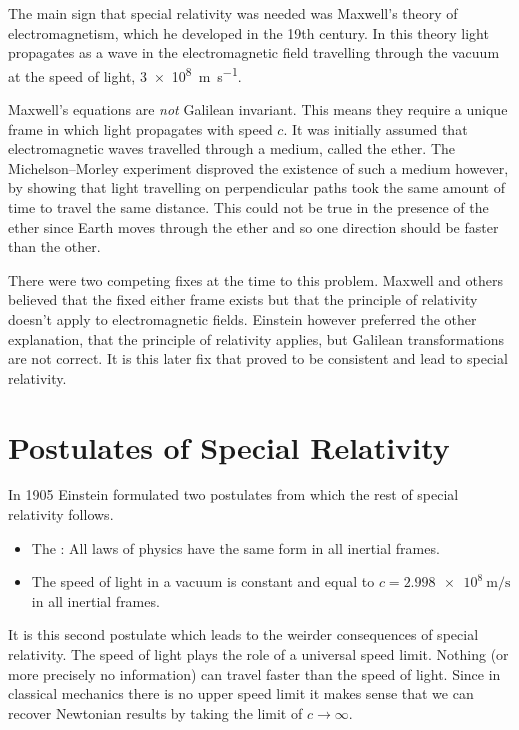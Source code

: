 \documentclass[fleqn]{NotesClass}
\begin{document}
    The main sign that special relativity was needed was Maxwell's theory of electromagnetism, which he developed in the 19th century.
    In this theory light propagates as a wave in the electromagnetic field travelling through the vacuum at the speed of light, \qty{3e8}{\metre\per\second}.
    
    Maxwell's equations are \emph{not} Galilean invariant.
    This means they require a unique frame in which light propagates with speed \(c\).
    It was initially assumed that electromagnetic waves travelled through a medium, called the ether.
    The Michelson--Morley experiment disproved the existence of such a medium however, by showing that light travelling on perpendicular paths took the same amount of time to travel the same distance.
    This could not be true in the presence of the ether since Earth moves through the ether and so one direction should be faster than the other.
    
    There were two competing fixes at the time to this problem.
    Maxwell and others believed that the fixed either frame exists but that the principle of relativity doesn't apply to electromagnetic fields.
    Einstein however preferred the other explanation, that the principle of relativity applies, but Galilean transformations are not correct.
    It is this later fix that proved to be consistent and lead to special relativity.
    
    \section{Postulates of Special Relativity}
    In 1905 Einstein formulated two postulates from which the rest of special relativity follows.
    \begin{itemize}
        \item The : All laws of physics have the same form in all inertial frames.
        \item The speed of light in a vacuum is constant and equal to \(c = \qty{2.998e8}{\metre\per\second}\) in all inertial frames.
    \end{itemize}
    
    It is this second postulate which leads to the weirder consequences of special relativity.
    The speed of light plays the role of a universal speed limit.
    Nothing (or more precisely no information) can travel faster than the speed of light.
    Since in classical mechanics there is no upper speed limit it makes sense that we can recover Newtonian results by taking the limit of \(c \to \infty\).
    
\end{document}
